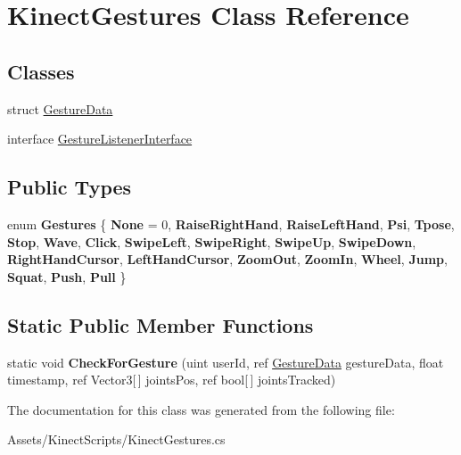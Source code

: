 \hypertarget{class_kinect_gestures}{}\section{Kinect\+Gestures Class Reference}
\label{class_kinect_gestures}
\subsection*{Classes}
\begin{DoxyCompactItemize}
\item 
struct \mbox{\hyperlink{struct_kinect_gestures_1_1_gesture_data}{Gesture\+Data}}
\item 
interface \mbox{\hyperlink{interface_kinect_gestures_1_1_gesture_listener_interface}{Gesture\+Listener\+Interface}}
\end{DoxyCompactItemize}
\subsection*{Public Types}
\begin{DoxyCompactItemize}
\item 
\mbox{\label{class_kinect_gestures_ae979f8f37dd7730c916cd84d7894a652}} 
enum {\bfseries Gestures} \{ \newline
{\bfseries None} = 0, 
{\bfseries Raise\+Right\+Hand}, 
{\bfseries Raise\+Left\+Hand}, 
{\bfseries Psi}, 
\newline
{\bfseries Tpose}, 
{\bfseries Stop}, 
{\bfseries Wave}, 
{\bfseries Click}, 
\newline
{\bfseries Swipe\+Left}, 
{\bfseries Swipe\+Right}, 
{\bfseries Swipe\+Up}, 
{\bfseries Swipe\+Down}, 
\newline
{\bfseries Right\+Hand\+Cursor}, 
{\bfseries Left\+Hand\+Cursor}, 
{\bfseries Zoom\+Out}, 
{\bfseries Zoom\+In}, 
\newline
{\bfseries Wheel}, 
{\bfseries Jump}, 
{\bfseries Squat}, 
{\bfseries Push}, 
\newline
{\bfseries Pull}
 \}
\end{DoxyCompactItemize}
\subsection*{Static Public Member Functions}
\begin{DoxyCompactItemize}
\item 
\mbox{\label{class_kinect_gestures_a4e572c3f5b759588e2af549ff90e63c4}} 
static void {\bfseries Check\+For\+Gesture} (uint user\+Id, ref \mbox{\hyperlink{struct_kinect_gestures_1_1_gesture_data}{Gesture\+Data}} gesture\+Data, float timestamp, ref Vector3\mbox{[}$\,$\mbox{]} joints\+Pos, ref bool\mbox{[}$\,$\mbox{]} joints\+Tracked)
\end{DoxyCompactItemize}


The documentation for this class was generated from the following file\+:\begin{DoxyCompactItemize}
\item 
Assets/\+Kinect\+Scripts/Kinect\+Gestures.\+cs\end{DoxyCompactItemize}
